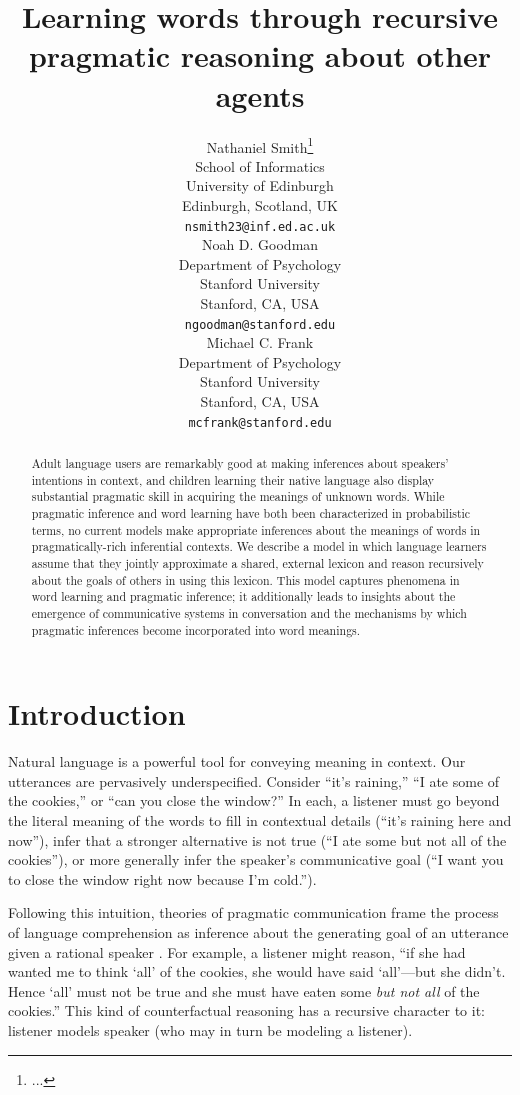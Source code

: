 \documentclass{article} %
\title{Learning words through recursive pragmatic reasoning about other agents}
\author{
Nathaniel Smith\thanks{...} \\
School of Informatics\\
University of Edinburgh\\
Edinburgh, Scotland, UK\\
\texttt{nsmith23@inf.ed.ac.uk} \\
\AND
Noah D. Goodman \\
Department of Psychology\\
Stanford University \\
Stanford, CA, USA \\
\texttt{ngoodman@stanford.edu} \\
\And
Michael C. Frank \\
Department of Psychology \\
Stanford University \\
Stanford, CA, USA \\
\texttt{mcfrank@stanford.edu}}
\begin{document}
\maketitle

\begin{abstract}
Adult language users are remarkably good at making inferences about speakers' intentions in context, and children learning their native language also display substantial pragmatic skill in acquiring the meanings of unknown words. While pragmatic inference and word learning have both been characterized in probabilistic terms, no current models make appropriate inferences about the meanings of words in pragmatically-rich inferential contexts. We describe a model in which language learners assume that they jointly approximate a shared, external lexicon and reason recursively about the goals of others in using this lexicon. This model captures phenomena in word learning and pragmatic inference; it additionally leads to insights about the emergence of communicative systems in conversation and the mechanisms by which pragmatic inferences become incorporated into word meanings. 
\end{abstract}

\section{Introduction}

Natural language is a powerful tool for conveying meaning in context. Our utterances are pervasively underspecified. Consider ``it's raining,'' ``I ate some of the cookies,'' or ``can you close the window?'' In each, a listener must go beyond the literal meaning of the words to fill in contextual details (``it's raining here and now''), infer that a stronger alternative is not true (``I ate some but not all of the cookies''), or more generally infer the speaker's communicative goal (``I want you to close the window right now because I'm cold.''). 

Following this intuition, theories of pragmatic communication frame the process of language comprehension as inference about the generating goal of an utterance given a rational speaker \cite{grice1975,dale1995,frank2012}. For example, a listener might reason, ``if she had wanted me to think `all' of the cookies, she would have said `all'---but she didn't. Hence `all' must not be true and she must have eaten some {\it but not all} of the cookies.'' This kind of counterfactual reasoning has a recursive character to it: listener models speaker (who may in turn be modeling a listener). 
\end{document}
